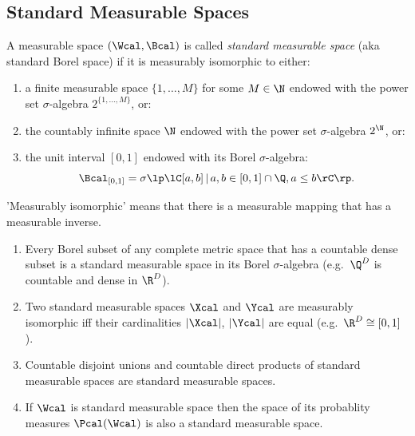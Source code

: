 \subsection{Standard Measurable Spaces}

\begin{Def}
 A measurable space $(\Wcal,\Bcal)$ is called \emph{standard measurable space} (aka standard Borel space) if it is measurably isomorphic to either:
    \begin{enumerate}
        \item a finite measurable space $\{1,\dots,M\}$ for some $M \in \N$ endowed with the power set $\sigma$-algebra $2^{\{1,\dots,M\}}$, or:
        \item the countably infinite space $\N$ endowed with the power set $\sigma$-algebra $2^\N$, or:
        \item the unit interval $[0,1]$ endowed with its Borel $\sigma$-algebra:
           \[\Bcal_{[0,1]} =\sigma\lp\lC [a,b]\,|\, a, b \in [0,1] \cap \Q, a \le b \rC \rp.\]
    \end{enumerate}
    'Measurably isomorphic' means that there is a measurable mapping that has a measurable inverse.
\end{Def}

\begin{Thm}[Kuratowski et al.]
    \begin{enumerate}
        \item Every Borel subset of any complete metric space that has a countable dense subset is a standard measurable space in its Borel $\sigma$-algebra 
    (e.g.\ $\Q^D$ is countable and dense in $\R^D$).
\item Two standard measurable spaces $\Xcal$ and $\Ycal$ are measurably isomorphic iff their cardinalities $|\Xcal|$, $|\Ycal|$ are equal 
    (e.g.\ $\R^D \cong [0,1]$).
\item Countable disjoint unions and countable direct products of standard measurable spaces are standard measurable spaces.
\item If $\Wcal$ is standard measurable space then the space of its probablity measures $\Pcal(\Wcal)$ is also a standard measurable space.
    \end{enumerate}
\end{Thm}

